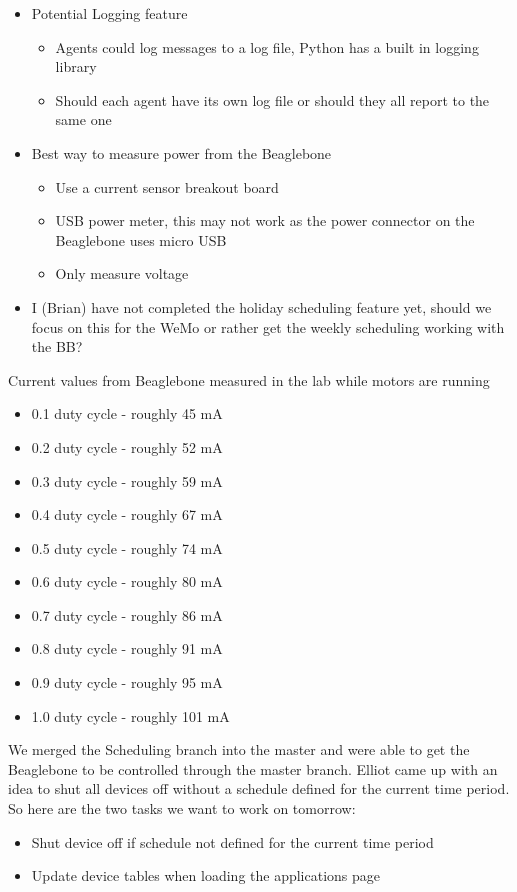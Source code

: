 \documentclass[fontsize=11pt, %
                             paper=letter, %
                             openany, %
                             captions=tableheading,
                             index=totoc,
                             hyperref]{labbook}
\begin{document}
\begin{itemize}
\begin{figure}[H]
\end{figure}
\item Potential Logging feature
\begin{itemize}
\item Agents could log messages to a log file, Python has a built in logging library
\item Should each agent have its own log file or should they all report to the same one
\end{itemize}
\item Best way to measure power from the Beaglebone
\begin{itemize}
\item Use a current sensor breakout board
\item USB power meter, this may not work as the power connector on the Beaglebone uses micro USB
\item Only measure voltage
\end{itemize}
\item I (Brian) have not completed the holiday scheduling feature yet, should we focus on this for the WeMo or rather get the weekly scheduling working with the BB?
\end{itemize}
Current values from Beaglebone measured in the lab while motors are running
\begin{itemize}
\item 0.1 duty cycle - roughly 45 mA
\item 0.2 duty cycle - roughly 52 mA
\item 0.3 duty cycle - roughly 59 mA
\item 0.4 duty cycle - roughly 67 mA
\item 0.5 duty cycle - roughly 74 mA
\item 0.6 duty cycle - roughly 80 mA
\item 0.7 duty cycle - roughly 86 mA
\item 0.8 duty cycle - roughly 91 mA
\item 0.9 duty cycle - roughly 95 mA
\item 1.0 duty cycle - roughly 101 mA
\end{itemize}
We merged the Scheduling branch into the master and were able to get the Beaglebone to be controlled through the master branch. Elliot came up with an idea to shut all devices off without a schedule defined for the current time period. So here are the two tasks we want to work on tomorrow:
\begin{itemize}
\item Shut device off if schedule not defined for the current time period
\item Update device tables when loading the applications page
\end{itemize}
\end{document}
